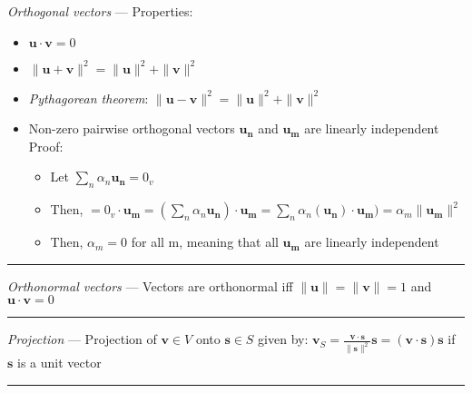 \emph{Orthogonal vectors} ---  Properties:
\begin{itemize}
    \item $\boldsymbol{u} \cdot \boldsymbol{v} = 0$
    \item $\|\boldsymbol{u} + \boldsymbol{v}\|^2 = \|\boldsymbol{u}\|^2 + \|\boldsymbol{v}\|^2$
    \item \emph{Pythagorean theorem}: $\|\boldsymbol{u} - \boldsymbol{v}\|^2 = \|\boldsymbol{u}\|^2 + \|\boldsymbol{v}\|^2$
    \item Non-zero pairwise orthogonal vectors $\boldsymbol{u_n}$ and $\boldsymbol{u_m}$ are linearly independent\\
    Proof:
    \begin{itemize}
        \item Let $\sum_n \alpha_n \boldsymbol{u_n} = 0_v$
        \item Then, $ = 0_v \cdot \boldsymbol{u_m} = (\sum_n \alpha_n \boldsymbol{u_n}) \cdot \boldsymbol{u_m} = \sum_n \alpha_n (\boldsymbol{u_n}) \cdot \boldsymbol{u_m}) = \alpha_m \|\boldsymbol{u_m}\|^2$
        \item Then, $\alpha_m = 0$ for all m, meaning that all $\boldsymbol{u_m}$ are linearly independent
    \end{itemize}
\end{itemize}

{\color{lightgray}\hrule height 0.001mm}

\emph{Orthonormal vectors} ---  Vectors are orthonormal iff $\|\boldsymbol{u}\| = \|\boldsymbol{v}\| = 1$ and $\boldsymbol{u} \cdot \boldsymbol{v} = 0$

{\color{lightgray}\hrule height 0.001mm}

\emph{Projection} --- Projection of $\boldsymbol{v} \in V$ onto $\boldsymbol{s} \in S$ given by: $\boldsymbol{v}_S = \frac{\boldsymbol{v} \cdot \boldsymbol{s}}{\|\boldsymbol{s}\|^2}\boldsymbol{s} = (\boldsymbol{v} \cdot \boldsymbol{s})\boldsymbol{s}$ if $\boldsymbol{s}$ is a unit vector

{\color{black}\hrule height 0.001mm}

